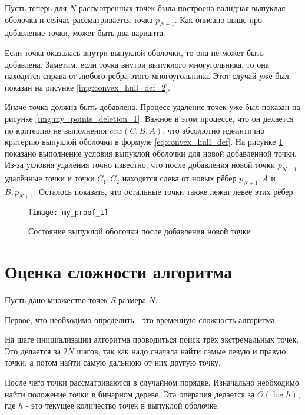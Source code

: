 Пусть теперь для $N$ рассмотренных точек была построена валидная выпуклая оболочка и сейчас рассматривается точка $p_{N+1}$. Как описано выше про добавление точки, может быть два варианта.

Если точка оказалась внутри выпуклой оболочки, то она не может быть добавлена. Заметим, если точка внутри выпуклого многугольника, то она находится справа от любого ребра этого многоугольника. Этот случай уже был показан на рисунке \ref{img:convex_hull_def_2}.

Иначе точка должна быть добавлена. Процесс удаление точек уже был показан на рисунке \ref{img:my_points_deletion_1}. Важное в этом процессе, что он делается по критерию не выполнения $ccw(C, B, A)$, что абсолютно идеинтично критерию выпуклой оболочки в формуле \ref{eq:convex_hull_def}. На рисунке \ref{img:my_proof} показано выполнение условия выпуклой оболочки для новой добавленной точки. Из-за условия удаления точно известно, что после добавления новой точки $p_{N+1}$ удалённые точки и точки $C_1, C_2$ находятся слева от новых рёбер $p_{N+1}, A$ и $B, p_{N+1}$. Осталось показать, что остальные точки также лежат левее этих рёбер.


\begin{figure}[H]
	\centering
	\texttt{[image: my\_proof\_1]}
	\caption{Состояние выпуклой оболочки после добавления новой точки}
	\label{img:my_proof}
\end{figure}

\section{Оценка сложности алгоритма} \label{subsect2_4}


Пусть дано множество точек $S$ размера $N$.

Первое, что необходимо определить - это временную сложность алгоритма.

На шаге инициализации алгоритма проводиться поиск трёх экстремальных точек. Это делается за $2 N$ шагов, так как надо сначала найти самые левую и правую точки, а потом найти самую дальнюю от них другую точку.

После чего точки рассматриваются в случайном порядке. Изначально необходимо найти положение точки в бинарном дереве. Эта операция делается за $O(\log h)$, где $h$ - это текущее количество точек в выпуклой оболочке.

